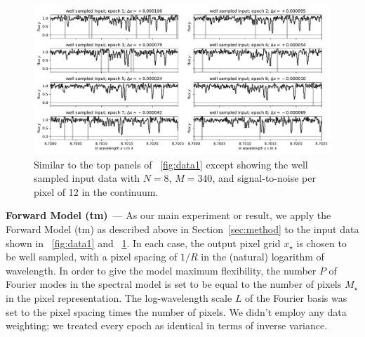 \documentclass[modern]{aastex631}
\renewcommand{\paragraph}[1]{\medskip\par\noindent\textbf{#1}~---}
\newlength{\figurewidth}
\newcommand{\sectionname}{Section}
\begin{document}
\begin{figure}[t!]
    \begin{mdframed}\begin{center}
    \includegraphics[width=1.3\figurewidth]{notebooks/data2.pdf}
    \end{center}
    \caption{Similar to the top panels of \figurename~\ref{fig:data1} except showing the well sampled input data with $N=8$, $M=340$, and signal-to-noise per pixel of 12 in the continuum.\label{fig:data2}}
    \end{mdframed}
\end{figure}

\paragraph{Forward Model (tm)}
As our main experiment or result, we apply the Forward Model (tm) as described above in \sectionname~\ref{sec:method} to the input data shown in \figurename~\ref{fig:data1} and \figurename~\ref{fig:data2}.
In each case, the output pixel grid $x_\star$ is chosen to be well sampled, with a pixel spacing of $1/R$ in the (natural) logarithm of wavelength.
In order to give the model maximum flexibility, the number $P$ of Fourier modes in the spectral model is set to be equal to the number of pixels $M_\star$ in the pixel representation.
The log-wavelength scale $L$ of the Fourier basis was set to the pixel spacing times the number of pixels.
We didn't employ any data weighting; we treated every epoch as identical in terms of inverse variance.
\end{document}
